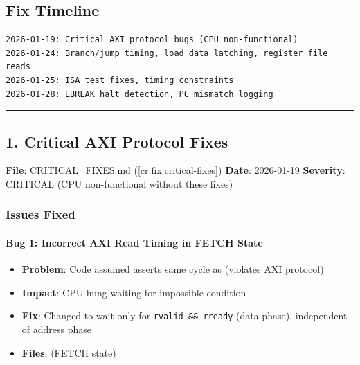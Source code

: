 \subsection{Fix Timeline}\label{cr:fix:fixes-index:fix-timeline}

\begin{record}

\begin{lstlisting}[language={}]
2026-01-19: Critical AXI protocol bugs (CPU non-functional)
2026-01-24: Branch/jump timing, load data latching, register file reads
2026-01-25: ISA test fixes, timing constraints
2026-01-28: EBREAK halt detection, PC mismatch logging
\end{lstlisting}

\begin{center}\rule{0.5\linewidth}{0.5pt}\end{center}

\end{record}

\subsection{1. Critical AXI Protocol Fixes}\label{cr:fix:fixes-index:1-critical-axi-protocol-fixes}

\begin{record}

\textbf{File}:
CRITICAL\_\allowbreak{}FIXES.md (\cref{cr:fix:critical-fixes})
\textbf{Date}: 2026-01-19 \textbf{Severity}: \bad{} CRITICAL (CPU
non-functional without these fixes)

\end{record}

\subsubsection{Issues Fixed}\label{cr:fix:fixes-index:issues-fixed}

\paragraph{Bug 1: Incorrect AXI Read Timing in FETCH State}\label{cr:fix:fixes-index:bug-1-incorrect-axi-read-timing-in-fetch-state}

\begin{record}

\begin{itemize}
\tightlist
\item
  \textbf{Problem}: Code assumed  asserts same cycle as
   (violates AXI protocol)
\item
  \textbf{Impact}: CPU hung waiting for impossible condition
\item
  \textbf{Fix}: Changed to wait only for \texttt{rvalid\ \&\&\ rready}
  (data phase), independent of address phase
\item
  \textbf{Files}:  (FETCH state)
\end{itemize}

\end{record}

